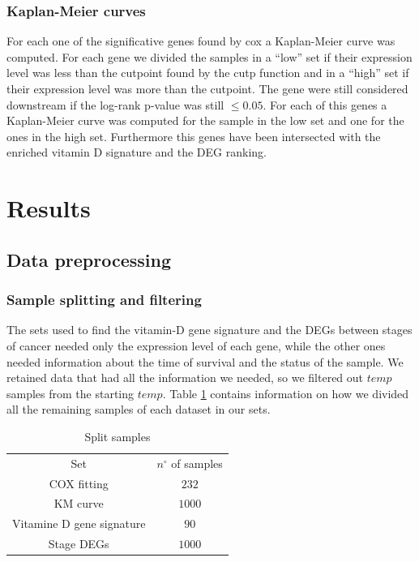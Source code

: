 \documentclass[fleqn,10pt]{SelfArx} %
\begin{document}
		\subsubsection{Kaplan-Meier curves}
			For each one of the significative genes found by cox a Kaplan-Meier curve was computed.
			For each gene we divided the samples in a ``low'' set if their expression level was less than the cutpoint found by the cutp function and in a ``high'' set if their expression level was more than the cutpoint.
			The gene were still considered downstream if the log-rank p-value was still $\le0.05$.
			For each of this genes a Kaplan-Meier curve was computed for the sample in the low set and one for the ones in the high set.
			Furthermore this genes have been intersected with the enriched vitamin D signature and the DEG ranking.


\section{Results}

	\subsection{Data preprocessing}

		\subsubsection{Sample splitting and filtering}
		The sets used to find the vitamin-D gene signature and the DEGs between stages of cancer needed only the expression level of each gene, while the other ones needed information about the time of survival and the status of the sample.
		We retained data that had all the information we needed, so we filtered out $temp$ samples from the starting $temp$.
		Table \ref{tab:samples_split} contains information on how we divided all the remaining samples of each dataset in our sets.

		\begin{table}[H]
			\centering
			\begin{tabular}{cc}
				\hline
				Set & $n^\circ$ of samples\\
				COX fitting & $232$\\
				KM curve & $1000$\\
				Vitamine D gene signature & $90$\\
				Stage DEGs & $1000$\\
				\hline
			\end{tabular}
			\caption{Split samples}
			\label{tab:samples_split}
		\end{table}
\end{document}
